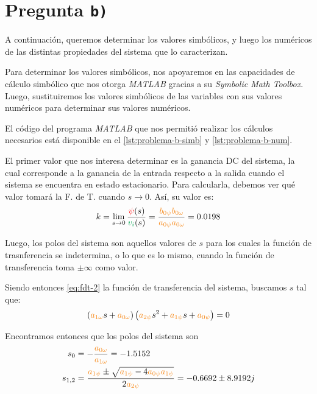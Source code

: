 \section{Pregunta \texttt{b)}}\label{pregunta-b}

A continuación, queremos determinar los valores simbólicos, y luego los
numéricos de las distintas propiedades del sistema que lo caracterizan.

Para determinar los valores simbólicos, nos apoyaremos en las capacidades
de cálculo simbólico que nos otorga \textit{MATLAB} gracias a su
\textit{Symbolic Math Toolbox}. Luego, sustituiremos los valores simbólicos de
las variables con sus valores numéricos para determinar sus valores numéricos.

El código del programa \textit{MATLAB} que nos permitió realizar los cálculos
necesarios está disponible en el \autoref{lst:problema-b-simb} y
\autoref{lst:problema-b-num}.

El primer valor que nos interesa determinar es la ganancia DC del sistema, la
cual corresponde a la ganancia de la entrada respecto a la salida cuando el
sistema se encuentra en estado estacionario. Para calcularla, debemos ver qué
valor tomará la F. de T. cuando $s \to 0$. Así, su valor es:
\begin{equation}\label{eq:gdc}
  k = \lim_{s \to 0} \frac{\rojo{\psi}(s)}{\verd{v_{i}}(s)} =
    \frac{\nara{b_{0\psi}b_{0\omega}}}{\nara{a_{0\psi}a_{0\omega}}} = 0.0198
\end{equation}

Luego, los polos del sistema son aquellos valores de $s$ para los cuales la
función de trasnferencia se indetermina, o lo que es lo mismo, cuando la
función de transferencia toma $\pm\infty$ como valor.

Siendo entonces \eqref{eq:fdt-2} la función de transferencia del sistema,
buscamos $s$ tal que:
\begin{equation}
  \left(\nara{a_{1\omega}}s + \nara{a_{0\omega}}\right)\left(\nara{a_{2\psi}}s^{2} + \nara{a_{1\psi}}s + \nara{a_{0\psi}}\right) = 0
\end{equation}

Encontramos entonces que los polos del sistema son
\begin{align}
  s_{0} &= -\frac{\nara{a_{0\omega}}}{\nara{a_{1\omega}}} = -1.5152 \\
  s_{1,2} &= \frac{\nara{a_{1\psi}} \pm \sqrt{\nara{a_{1\psi}} - 4 \nara{a_{0\psi}a_{1\psi}}}}{2\nara{a_{2\psi}}} = -0.6692 \pm 8.9192j
\end{align}

